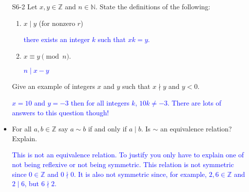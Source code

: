 \documentclass[10pt]{article}
\newcommand{\Z}{\mathbb{Z}}
\newcommand{\N}{\mathbb{N}}
\newcommand{\blue}{\textcolor{blue}}
\newcommand{\bs}{\begin{solution}}
\begin{document}
\begin{itemize}
\item[S6-2] Let $x,y\in\Z$ and $n\in\N$. State the definitions of the following:
\begin{enumerate}
\item $x\mid y$ (for nonzero $r$) \bs\blue{there exists an integer $k$ such that $xk=y$.}\end{solution}
\vspace{.5in}
\item  $x \equiv y\pmod{n}$.  
\bs\blue{$n\mid x-y$}\end{solution}
\vspace{.5in}
\end{enumerate}

Give an example of integers $x$ and $y$ such that $x\nmid y $ and $y<0$.
\bs\blue{$x = 10$ and $y=-3$ then for all integers $k$, $10k \neq -3$. There are lots of answers to this question though!}\end{solution}
\vspace{1in}

\item[S5-1] For all $a,b\in \Z$ say $a\sim b$ if and only if $a\mid b$.  Is $\sim$ an equivalence relation? Explain.
\bs \blue{This is not an equivalence relation. To justify you only have to explain one of not being reflexive or not being symmetric. This relation is not symmetric since $0\in\Z$ and $0\nmid 0$. It is also not symmetric since, for example, $2,6\in\Z$ and $2\mid 6$, but $6\nmid 2$.} \end{solution}

\end{itemize}
\end{document}
